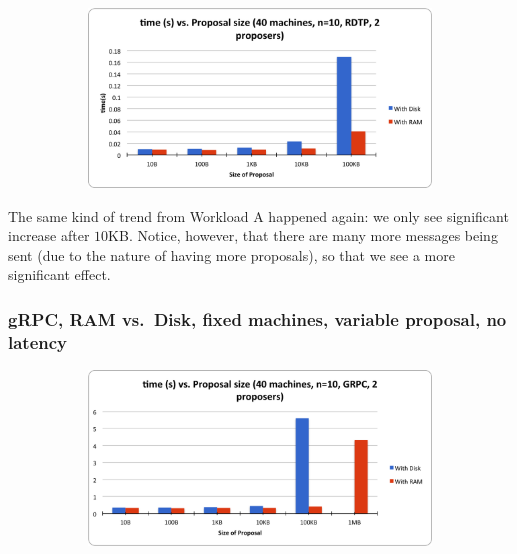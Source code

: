 \documentclass[12pt,]{article}
\begin{document}
\begin{figure}[H]
\centering
\begin{subfigure}{0.8\textwidth}
    \centering
    \includegraphics[width=1.0\textwidth]{two_proposers_RDTP_fixed_machines_variable_proposal_no_latency.png}
\end{subfigure}
\end{figure}

The same kind of trend from Workload A happened again: we only see significant increase after $10$KB. Notice, however, that there are many more messages being sent (due to the nature of having more proposals), so that we see a more significant effect.

\subsubsection{gRPC, RAM vs.~Disk, fixed machines, variable proposal, no
latency}\label{grpc-ram-vs.disk-fixed-machines-variable-proposal-no-latency-1}

\begin{figure}[H]
\centering
\begin{subfigure}{0.8\textwidth}
    \centering
    \includegraphics[width=1.0\textwidth]{two_proposers_GRPC_fixed_machines_variable_proposal_no_latency.png}
\end{subfigure}
\end{figure}
\end{document}
